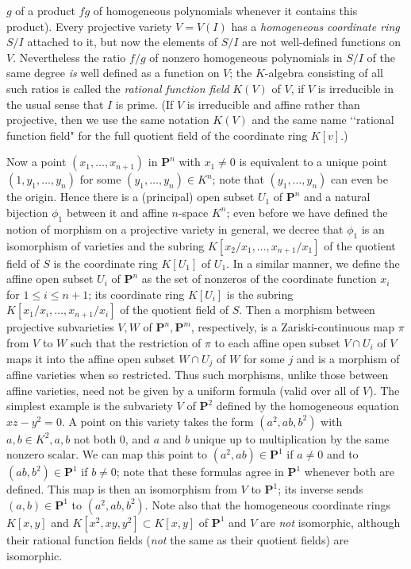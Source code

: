 \documentclass[10pt]{article}
\begin{document}
$g$ of a product $fg$ of homogeneous polynomials whenever it contains
this product). Every projective variety $V=V(I)$ has a {\sl homogeneous
  coordinate ring} $S/I$ attached to it, but now the elements of $S/I$
are not well-defined functions on $V$. Nevertheless the ratio $f/g$ of
nonzero homogeneous polynomials in $S/I$ of the same degree {\sl is}
well defined as a function on $V$; the $K$-algebra consisting of all
such ratios is called the {\sl rational function field} $K(V)$ of $V$,
if $V$ is irreducible in the usual sense that $I$ is prime. (If $V$ is
irreducible and affine rather than projective, then we use the same
notation $K(V)$ and the same name \lq\lq rational function field" for
the full quotient field of the coordinate ring $K[v]$.)

Now a point $(x_1,\ldots,x_{n+1})$ in $\mathbf P^n$ with $x_1\ne0$ is
equivalent to a unique point $(1,y_1,\ldots,y_n)$ for some
$(y_1,\ldots,y_n)\in K^n$; note that $(y_1,\ldots,y_n)$ can even be the
origin. Hence there is a (principal) open subset $U_1$ of $\mathbf P^n$
and a natural bijection $\phi_1$ between it and affine $n$-space $K^n$;
even before we have defined the notion of morphism on a projective
variety in general, we decree that $\phi_1$ is an isomorphism of
varieties and the subring $K[x_2/x_1,\ldots,x_{n+1}/x_1]$ of the
quotient field of $S$ is the coordinate ring $K[U_1]$ of $U_1$. In a
similar manner, we define the affine open subset $U_i$ of $\mathbf P^n$
as the set of nonzeros of the coordinate function $x_i$ for $1\le i\le
n+1$; its coordinate ring $K[U_i]$ is the subring
$K[x_1/x_i,\ldots,x_{n+1}/x_i]$ of the quotient field of $S$. Then a
morphism between projective subvarieties $V,W$ of $\mathbf P^n,\mathbf
P^m$, respectively, is a Zariski-continuous map $\pi$ from $V$ to $W$
such that the restriction of $\pi$ to each affine open subset $V\cap
U_i$ of $V$ maps it into the affine open subset $W\cap U_j$ of $W$ for
some $j$ and is a morphism of affine varieties when so restricted. Thus
such morphisms, unlike those between affine varieties, need not be given
by a uniform formula (valid over all of $V$). The simplest example is
the subvariety $V$ of $\mathbf P^2$ defined by the homogeneous equation
$xz - y^2 = 0$. A point on this variety takes the form $(a^2,ab,b^2)$
with $a,b\in K^2, a,b$ not both 0, and $a$ and $b$ unique up to
multiplication by the same nonzero scalar. We can map this point to
$(a^2,ab)\in\mathbf P^1$ if $a\ne0$ and to $(ab,b^2)\in\mathbf P^1$ if
$b\ne0$; note that these formulas agree in $\mathbf P^1$ whenever both
are defined. This map is then an isomorphism from $V$ to $\mathbf P^1$;
its inverse sends $(a,b)\in\mathbf P^1$ to $(a^2,ab,b^2)$. Note also
that the homogeneous coordinate rings $K[x,y]$ and $K[x^2,xy,y^2]\subset
K[x,y]$ of $\mathbf P^1$ and $V$ are {\sl not} isomorphic, although
their rational function fields ({\sl not} the same as their quotient
fields) are isomorphic.
\end{document}
